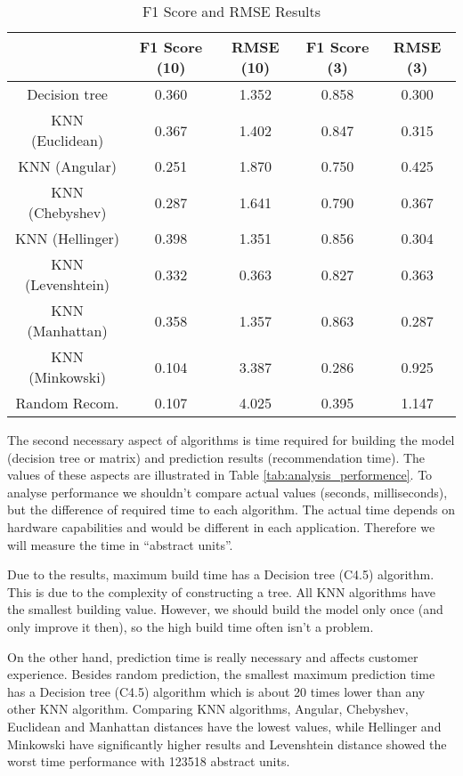 \begin{table}[h]
    \centering
    {\small
    \begin{tabular}{|c|c|c|c|c|}
        \hline
         & F1 Score (10) & RMSE (10) & F1 Score (3) & RMSE (3) \\        
        \hline
        Decision tree       & 0.360 & 1.352 & 0.858& 0.300\\
        \hline
        KNN (Euclidean)     & 0.367 & 1.402 & 0.847 & 0.315\\
        \hline
        KNN (Angular)       & 0.251 &1.870 & 0.750 & 0.425\\
        \hline
        KNN (Chebyshev)     & 0.287	& 1.641& 0.790 & 0.367\\
        \hline
        KNN (Hellinger)     & 0.398 & 1.351 & 0.856 & 0.304\\
        \hline
        KNN (Levenshtein)   & 0.332 & 0.363 & 0.827 & 0.363\\
        \hline
        KNN (Manhattan)     & 0.358 & 1.357 & 0.863 & 0.287\\
        \hline
        KNN (Minkowski)     & 0.104	& 3.387 & 0.286 & 0.925\\
        \hline
        Random Recom.       & 0.107 & 4.025 & 0.395 & 1.147\\
        \hline
    \end{tabular}
    }
    \caption{F1 Score and RMSE Results}\label{tab:analysis_scores}
\end{table}

The second necessary aspect of algorithms is time required for building the model (decision tree or matrix) and prediction results (recommendation time). The values of these aspects are illustrated in Table \ref{tab:analysis_performence}. To analyse performance we shouldn't compare actual values (seconds, milliseconds), but the difference of required time to each algorithm. The actual time depends on hardware capabilities and would be different in each application. Therefore we will measure the time in “abstract units”.

Due to the results, maximum build time has a Decision tree (C4.5) algorithm. This is due to the complexity of constructing a tree. All KNN algorithms have the smallest building value. However, we should build the model only once (and only improve it then), so the high build time often isn't a problem.

On the other hand, prediction time is really necessary and affects customer experience. Besides random prediction, the smallest maximum prediction time has a Decision tree (C4.5) algorithm which is about 20 times lower than any other KNN algorithm. Comparing KNN algorithms, Angular, Chebyshev, Euclidean and Manhattan distances have the lowest values, while Hellinger and Minkowski have significantly higher results and Levenshtein distance showed the worst time performance with 123518 abstract units.

